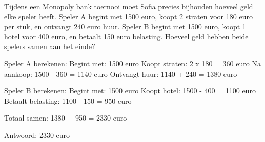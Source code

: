 \begin{opgave}
Tijdens een Monopoly bank toernooi moet Sofia precies bijhouden hoeveel geld 
elke speler heeft. Speler A begint met 1500 euro, koopt 2 straten voor 180 
euro per stuk, en ontvangt 240 euro huur. Speler B begint met 1500 euro, 
koopt 1 hotel voor 400 euro, en betaalt 150 euro belasting. Hoeveel geld 
hebben beide spelers samen aan het einde?
\end{opgave}

\begin{oplossing}
Speler A berekenen:
Begint met: 1500 euro
Koopt straten: 2 x 180 = 360 euro
Na aankoop: 1500 - 360 = 1140 euro
Ontvangt huur: 1140 + 240 = 1380 euro

Speler B berekenen:
Begint met: 1500 euro
Koopt hotel: 1500 - 400 = 1100 euro
Betaalt belasting: 1100 - 150 = 950 euro

Totaal samen:
1380 + 950 = 2330 euro

Antwoord: 2330 euro
\end{oplossing}